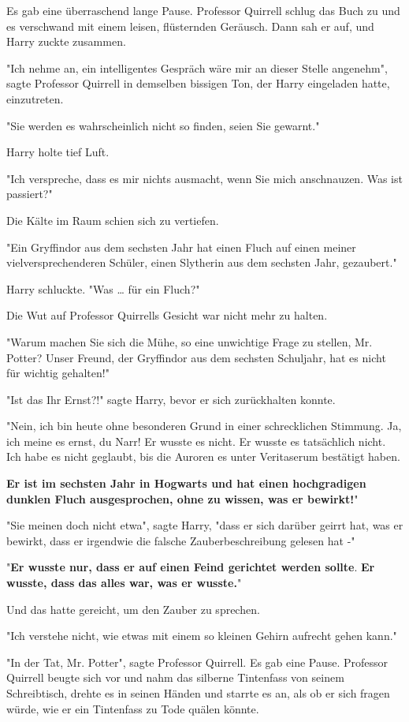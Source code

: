 {Es gab eine überraschend lange Pause. Professor Quirrell schlug das Buch zu und es verschwand mit einem leisen, flüsternden Geräusch. Dann sah er auf, und Harry zuckte zusammen.

"Ich nehme an, ein intelligentes Gespräch wäre mir an dieser Stelle angenehm", sagte Professor Quirrell in demselben bissigen Ton, der Harry eingeladen hatte, einzutreten.

"Sie werden es wahrscheinlich nicht so finden, seien Sie gewarnt."

Harry holte tief Luft.

"Ich verspreche, dass es mir nichts ausmacht, wenn Sie mich anschnauzen. Was ist passiert?"

Die Kälte im Raum schien sich zu vertiefen.

"Ein Gryffindor aus dem sechsten Jahr hat einen Fluch auf einen meiner vielversprechenderen Schüler, einen Slytherin aus dem sechsten Jahr, gezaubert."

Harry schluckte. "Was … für ein Fluch?"

Die Wut auf Professor Quirrells Gesicht war nicht mehr zu halten.

"Warum machen Sie sich die Mühe, so eine unwichtige Frage zu stellen, Mr. Potter? Unser Freund, der Gryffindor aus dem sechsten Schuljahr, hat es nicht für wichtig gehalten!"

"Ist das Ihr Ernst?!" sagte Harry, bevor er sich zurückhalten konnte.

"Nein, ich bin heute ohne besonderen Grund in einer schrecklichen Stimmung. Ja, ich meine es ernst, du Narr! Er wusste es nicht. Er wusste es tatsächlich nicht. Ich habe es nicht geglaubt, bis die Auroren es unter Veritaserum bestätigt haben.

\textbf{Er ist im sechsten Jahr in Hogwarts und hat einen hochgradigen dunklen Fluch ausgesprochen, ohne zu wissen, was er bewirkt!}"

"Sie meinen doch nicht etwa", sagte Harry, "dass er sich darüber geirrt hat, was er bewirkt, dass er irgendwie die falsche Zauberbeschreibung gelesen hat -"

"\textbf{Er wusste nur, dass er auf einen Feind gerichtet werden sollte}. \textbf{Er wusste, dass das alles war, was er wusste.}"

Und das hatte gereicht, um den Zauber zu sprechen.

"Ich verstehe nicht, wie etwas mit einem so kleinen Gehirn aufrecht gehen kann."

"In der Tat, Mr. Potter", sagte Professor Quirrell. Es gab eine Pause. Professor Quirrell beugte sich vor und nahm das silberne Tintenfass von seinem Schreibtisch, drehte es in seinen Händen und starrte es an, als ob er sich fragen würde, wie er ein Tintenfass zu Tode quälen könnte.

}
